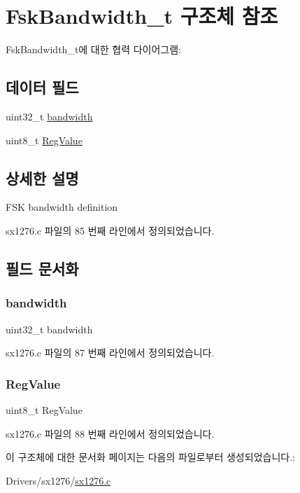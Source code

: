 \hypertarget{struct_fsk_bandwidth__t}{}\section{Fsk\+Bandwidth\+\_\+t 구조체 참조}
\label{struct_fsk_bandwidth__t}


Fsk\+Bandwidth\+\_\+t에 대한 협력 다이어그램\+:
\subsection*{데이터 필드}
\begin{DoxyCompactItemize}
\item 
uint32\+\_\+t \mbox{\hyperlink{struct_fsk_bandwidth__t_aa3ebacb990d54160273ab642ea776a0b}{bandwidth}}
\item 
uint8\+\_\+t \mbox{\hyperlink{struct_fsk_bandwidth__t_aa94d5fda42e8478adfd2312cf28d0626}{Reg\+Value}}
\end{DoxyCompactItemize}


\subsection{상세한 설명}
F\+SK bandwidth definition 

sx1276.\+c 파일의 85 번째 라인에서 정의되었습니다.



\subsection{필드 문서화}
\mbox{\label{struct_fsk_bandwidth__t_aa3ebacb990d54160273ab642ea776a0b}} 
\subsubsection{\texorpdfstring{bandwidth}{bandwidth}}
{\footnotesize\ttfamily uint32\+\_\+t bandwidth}



sx1276.\+c 파일의 87 번째 라인에서 정의되었습니다.

\mbox{\label{struct_fsk_bandwidth__t_aa94d5fda42e8478adfd2312cf28d0626}} 
\subsubsection{\texorpdfstring{Reg\+Value}{RegValue}}
{\footnotesize\ttfamily uint8\+\_\+t Reg\+Value}



sx1276.\+c 파일의 88 번째 라인에서 정의되었습니다.



이 구조체에 대한 문서화 페이지는 다음의 파일로부터 생성되었습니다.\+:\begin{DoxyCompactItemize}
\item 
Drivers/sx1276/\mbox{\hyperlink{sx1276_8c}{sx1276.\+c}}\end{DoxyCompactItemize}
